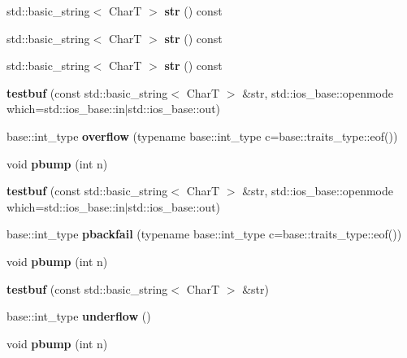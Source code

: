 \begin{DoxyCompactItemize}
\mbox{\label{structtestbuf_a077afc7549a2a7a21f840ba884695eab}} 
std\+::basic\+\_\+string$<$ CharT $>$ {\bfseries str} () const
\item 
\mbox{\label{structtestbuf_a077afc7549a2a7a21f840ba884695eab}} 
std\+::basic\+\_\+string$<$ CharT $>$ {\bfseries str} () const
\item 
\mbox{\label{structtestbuf_a077afc7549a2a7a21f840ba884695eab}} 
std\+::basic\+\_\+string$<$ CharT $>$ {\bfseries str} () const
\item 
\mbox{\label{structtestbuf_a40fb95e3100a5849749f228f0e804374}} 
{\bfseries testbuf} (const std\+::basic\+\_\+string$<$ CharT $>$ \&str, std\+::ios\+\_\+base\+::openmode which=std\+::ios\+\_\+base\+::in$\vert$std\+::ios\+\_\+base\+::out)
\item 
\mbox{\label{structtestbuf_a0aee1583fddb5d72051ee289572610c4}} 
base\+::int\+\_\+type {\bfseries overflow} (typename base\+::int\+\_\+type c=base\+::traits\+\_\+type\+::eof())
\item 
\mbox{\label{structtestbuf_a3780d8e6579af5fd714c4237fad00f45}} 
void {\bfseries pbump} (int n)
\item 
\mbox{\label{structtestbuf_a40fb95e3100a5849749f228f0e804374}} 
{\bfseries testbuf} (const std\+::basic\+\_\+string$<$ CharT $>$ \&str, std\+::ios\+\_\+base\+::openmode which=std\+::ios\+\_\+base\+::in$\vert$std\+::ios\+\_\+base\+::out)
\item 
\mbox{\label{structtestbuf_acde444ec4c8e0efce848d2ab19cb61a1}} 
base\+::int\+\_\+type {\bfseries pbackfail} (typename base\+::int\+\_\+type c=base\+::traits\+\_\+type\+::eof())
\item 
\mbox{\label{structtestbuf_a3780d8e6579af5fd714c4237fad00f45}} 
void {\bfseries pbump} (int n)
\item 
\mbox{\label{structtestbuf_aade97a7fab3e46f2b3d604917be590a8}} 
{\bfseries testbuf} (const std\+::basic\+\_\+string$<$ CharT $>$ \&str)
\item 
\mbox{\label{structtestbuf_a7f76d04a233fa7fa83f479ccfa40b99b}} 
base\+::int\+\_\+type {\bfseries underflow} ()
\item 
\mbox{\label{structtestbuf_a3780d8e6579af5fd714c4237fad00f45}} 
void {\bfseries pbump} (int n)
\end{DoxyCompactItemize}
